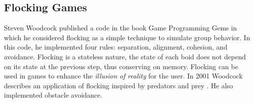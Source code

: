 \subsection{Flocking Games}
Steven Woodcock published a code in the book Game Programming Gems in which he considered flocking as a simple technique to simulate group behavior\cite{gems1}. In this code, he implemented four rules: separation, alignment, cohesion, and avoidance.  Flocking is a stateless nature, the state of each boid does not depend on its state at the previous step, thus conserving on memory. Flocking can be used in games to enhance the \textit{illusion of reality} for the user.  In 2001 Woodcock describes an application of flocking inspired by predators and prey \cite{gems2}. 
He also implemented obstacle avoidance.

